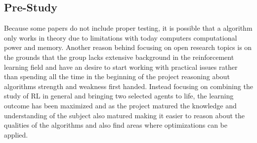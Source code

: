 \subsection{Pre-Study }



Because some papers do not include proper testing, it is possible that a algorithm only works in theory due to limitations with today computers computational power and memory. Another reason behind focusing on open research topics is on the grounds that the group lacks extensive background in the reinforcement learning field and have an desire to start working with practical issues rather than spending all the time in the beginning of the project reasoning about algorithms strength and weakness first handed. Instead focusing on combining the study of RL in general and bringing two selected agents to life, the learning outcome has been maximized and as the project matured the knowledge and understanding of the subject also matured making it easier to reason about the qualities of the algorithms and also find areas where optimizations can be applied. 
